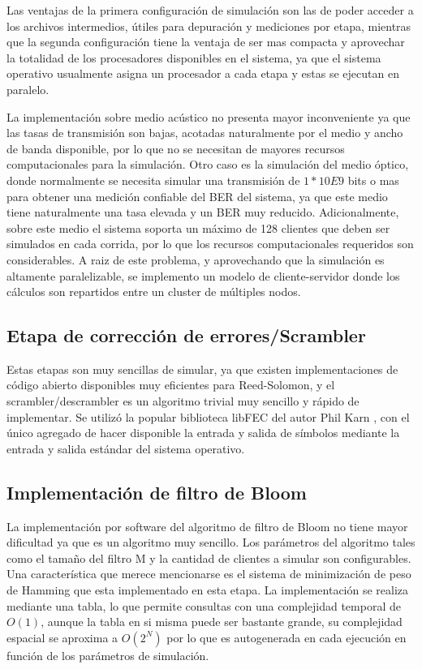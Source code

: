 Las ventajas de la primera configuración de simulación son las de poder acceder a los archivos intermedios, útiles para depuración y mediciones por etapa, mientras que la segunda configuración tiene la ventaja de ser mas compacta y aprovechar la totalidad de los procesadores disponibles en el sistema, ya que el sistema operativo usualmente asigna un procesador a cada etapa y estas se ejecutan en paralelo.

La implementación sobre medio acústico no presenta mayor inconveniente ya que las tasas de transmisión son bajas, acotadas naturalmente por el medio y ancho de banda disponible, por lo 
que no se necesitan de mayores recursos computacionales para la simulación. Otro caso es la simulación del medio óptico, donde normalmente se necesita simular una transmisión de $1*10E9$ bits o mas para obtener una medición confiable del BER del sistema, ya que este medio tiene naturalmente una tasa elevada y un BER muy reducido. Adicionalmente, sobre este medio el sistema soporta un máximo de 128 clientes que deben ser simulados en cada corrida, por lo que los recursos computacionales requeridos son considerables. A raiz de este problema, y aprovechando que la simulación es altamente paralelizable, se implemento un modelo de cliente-servidor donde los cálculos son repartidos entre un cluster de múltiples nodos.

\subsection{Etapa de corrección de errores/Scrambler}
Estas etapas son muy sencillas de simular, ya que existen implementaciones de código abierto disponibles muy eficientes para Reed-Solomon, y el scrambler/descrambler es un algoritmo trivial muy sencillo y rápido de implementar. Se utilizó la popular biblioteca libFEC del autor Phil Karn \cite{libfec}, con el único agregado de hacer disponible la entrada y salida de símbolos mediante la entrada y salida estándar del sistema operativo.

\subsection{Implementación de filtro de Bloom}
La implementación por software del algoritmo de filtro de Bloom no tiene mayor dificultad ya que es un algoritmo muy sencillo. Los parámetros del algoritmo tales como el tamaño del filtro M y la cantidad de clientes a simular son configurables. Una característica que merece mencionarse es el sistema de minimización de peso de Hamming que esta implementado en esta etapa. La implementación se realiza mediante una tabla, lo que permite consultas con una complejidad temporal de $O(1)$, aunque la tabla en si misma puede ser bastante grande, su complejidad espacial se aproxima a $O(2^{N})$ por lo que es autogenerada en cada ejecución en función de los parámetros de simulación.

